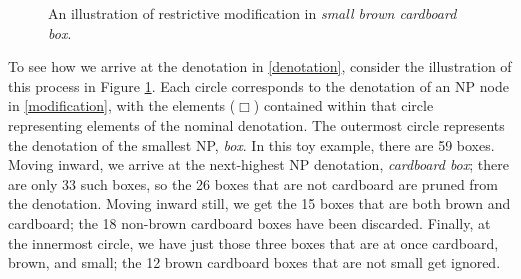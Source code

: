 \documentclass{sp}
\begin{document}
\begin{figure}[t]
	\caption{An illustration of restrictive modification in \emph{small brown cardboard box}.}\label{mod-fig}
\end{figure}


To see how we arrive at the denotation in \ref{denotation}, consider the illustration of this process in Figure \ref{mod-fig}. Each circle corresponds to the denotation of an NP node in \ref{modification}, with the elements ($\Box$) contained within that circle representing elements of the nominal denotation. The outermost circle represents the denotation of the smallest NP, \emph{box}. In this toy example, there are 59 boxes. Moving inward, we arrive at the next-highest NP denotation, \emph{cardboard box}; there are only 33 such boxes, so the 26 boxes that are not cardboard are pruned from the denotation. Moving inward still, we get the 15 boxes that are both brown and cardboard; the 18 non-brown cardboard boxes have been discarded. Finally, at the innermost circle, we have just those three boxes that are at once cardboard, brown, and small; the 12 brown cardboard boxes that are not small get ignored.
\end{document}
